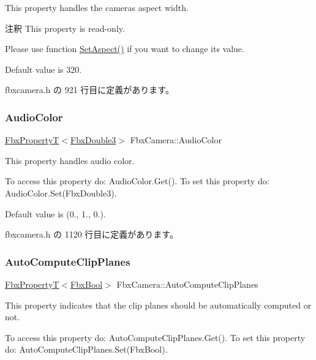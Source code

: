 This property handles the camera\textquotesingle{}s aspect width.

\begin{DoxyRemark}{注釈}
This property is read-\/only. 

Please use function \hyperlink{class_fbx_camera_adb9cf67e4b59463add6a052003797392}{Set\+Aspect()} if you want to change its value.
\end{DoxyRemark}
Default value is 320. 

 fbxcamera.\+h の 921 行目に定義があります。

\mbox{\label{class_fbx_camera_a39719d29cec7526134a1856a8c8e1995}} 
\subsubsection{\texorpdfstring{Audio\+Color}{AudioColor}}
{\footnotesize\ttfamily \hyperlink{class_fbx_property_t}{Fbx\+PropertyT}$<$\hyperlink{fbxtypes_8h_ae0a96f14cde566774c7553aa7523b7a7}{Fbx\+Double3}$>$ Fbx\+Camera\+::\+Audio\+Color}

This property handles audio color.

To access this property do\+: Audio\+Color.\+Get(). To set this property do\+: Audio\+Color.\+Set(\+Fbx\+Double3).

Default value is (0., 1., 0.). 

 fbxcamera.\+h の 1120 行目に定義があります。

\mbox{\label{class_fbx_camera_a416ffa14cbcdc07b2559bbbed7371d75}} 
\subsubsection{\texorpdfstring{Auto\+Compute\+Clip\+Planes}{AutoComputeClipPlanes}}
{\footnotesize\ttfamily \hyperlink{class_fbx_property_t}{Fbx\+PropertyT}$<$\hyperlink{fbxtypes_8h_a92e0562b2fe33e76a242f498b362262e}{Fbx\+Bool}$>$ Fbx\+Camera\+::\+Auto\+Compute\+Clip\+Planes}

This property indicates that the clip planes should be automatically computed or not.

To access this property do\+: Auto\+Compute\+Clip\+Planes.\+Get(). To set this property do\+: Auto\+Compute\+Clip\+Planes.\+Set(\+Fbx\+Bool).

